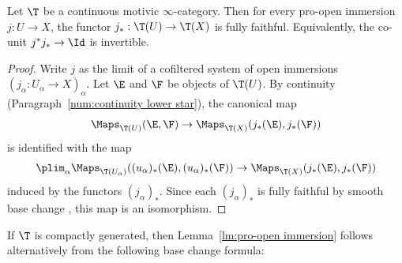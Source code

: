 
\begin{lm}\label{lm:pro-open immersion}
Let $\T$ be a continuous motivic $\infty$-category.
Then for every pro-open immersion $j : U \to X$, the functor $j_* : \T(U) \to \T(X)$ is fully faithful.
Equivalently, the co-unit $j^*j_* \to \Id$ is invertible.
\end{lm}
\begin{proof}
Write $j$ as the limit of a cofiltered system of open immersions \hbox{$(j_\alpha\!:\!U_\alpha\!\to\!X)_\alpha$}.
Let $\E$ and $\F$ be objects of $\T(U)$.
By continuity (Paragraph~\ref{num:continuity lower star}), the canonical map
\[
\Maps_{\T(U)}(\E, \F)
\to \Maps_{\T(X)}(j_*(\E), j_*(\F))
\]
is identified with the map
\[
\plim_\alpha \Maps_{\T(U_\alpha)}((u_\alpha)_*(\E), (u_\alpha)_*(\F))
\to \Maps_{\T(X)}(j_*(\E), j_*(\F))
\]
induced by the functors $(j_\alpha)_*$.
Since each $(j_\alpha)_*$ is fully faithful by smooth base change \cite[1.1.20]{CD3}, this map is an isomorphism.
\end{proof}

If $\T$ is compactly generated, then Lemma~\ref{lm:pro-open immersion} follows alternatively from the following base change formula:

